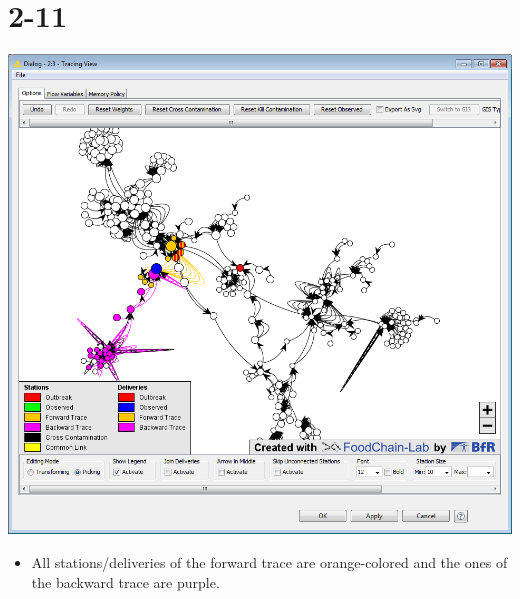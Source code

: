 \documentclass[10pt]{beamer}
\begin{document}
\section{2-11}
\begin{frame}
	\begin{center}
  		\includegraphics[height=0.6\textheight]{2-11.png}
	\end{center}
	\begin{itemize}
		\item All stations/deliveries of the forward trace are orange-colored and the ones of the backward trace are purple.
	\end{itemize}
\end{frame}
\end{document}
